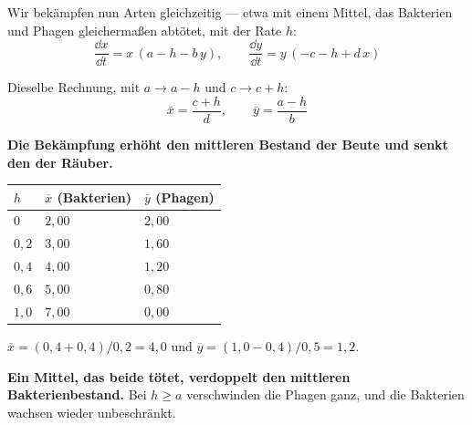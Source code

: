 \begin{merksatz}
Wir bekämpfen nun  Arten gleichzeitig --- etwa mit einem Mittel, das Bakterien und Phagen gleichermaßen abtötet, mit der Rate $h$:
\[ \frac{\dd x}{\dd t} = x\,(a - h - b\,y), \qquad \frac{\dd y}{\dd t} = y\,(-c - h + d\,x) \]

Dieselbe Rechnung, mit $a \to a-h$ und $c \to c+h$:
\[ \overline{x} = \frac{c+h}{d}, \qquad \overline{y} = \frac{a-h}{b} \]

\begin{center}
\begin{minipage}{0.9\textwidth}
\textbf{Die Bekämpfung erhöht den mittleren Bestand der Beute und senkt den der Räuber.}
\end{minipage}
\end{center}

\begin{center}
\renewcommand{\arraystretch}{1.48}
\begin{tabular}{@{}P{2.2cm}P{2.2cm}P{2.2cm}@{}}
\toprule
$h$ & $\overline x$ (Bakterien) & $\overline y$ (Phagen)\\
\midrule
$0$ & $2{,}00$ & $2{,}00$\\
$0{,}2$ & $3{,}00$ & $1{,}60$\\
$0{,}4$ & $4{,}00$ & $1{,}20$\\
$0{,}6$ & $5{,}00$ & $0{,}80$\\
$1{,}0$ & $7{,}00$ & \textcolor{akzent}{$0{,}00$}\\
\bottomrule
\end{tabular}
\end{center}

 $\overline x = (0{,}4+0{,}4)/0{,}2 = 4{,}0$ und $\overline y = (1{,}0-0{,}4)/0{,}5 = 1{,}2$.

\begin{center}
\begin{minipage}{0.9\textwidth}
\textbf{Ein Mittel, das beide tötet, verdoppelt den mittleren Bakterienbestand.} Bei $h \ge a$ verschwinden die Phagen ganz, und die Bakterien wachsen wieder unbeschränkt.
\end{minipage}
\end{center}
\end{merksatz}

